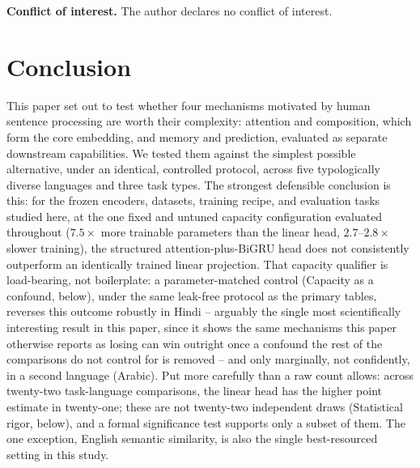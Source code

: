 \documentclass[manuscript]{acmart}
\begin{document}
\textbf{Conflict of interest.} The author declares no conflict of interest.

\section{Conclusion}

This paper set out to test whether four mechanisms motivated by human sentence processing are worth their complexity: attention and composition, which form the core embedding, and memory and prediction, evaluated as separate downstream capabilities. We tested them against the simplest possible alternative, under an identical, controlled protocol, across five typologically diverse languages and three task types. The strongest defensible conclusion is this: for the frozen encoders, datasets, training recipe, and evaluation tasks studied here, at the one fixed and untuned capacity configuration evaluated throughout ($7.5\times$ more trainable parameters than the linear head, $2.7$--$2.8\times$ slower training), the structured attention-plus-BiGRU head does not consistently outperform an identically trained linear projection. That capacity qualifier is load-bearing, not boilerplate: a parameter-matched control (Capacity as a confound, below), under the same leak-free protocol as the primary tables, reverses this outcome robustly in Hindi -- arguably the single most scientifically interesting result in this paper, since it shows the same mechanisms this paper otherwise reports as losing can win outright once a confound the rest of the comparisons do not control for is removed -- and only marginally, not confidently, in a second language (Arabic). Put more carefully than a raw count allows: across twenty-two task-language comparisons, the linear head has the higher point estimate in twenty-one; these are not twenty-two independent draws (Statistical rigor, below), and a formal significance test supports only a subset of them. The one exception, English semantic similarity, is also the single best-resourced setting in this study.
\end{document}
